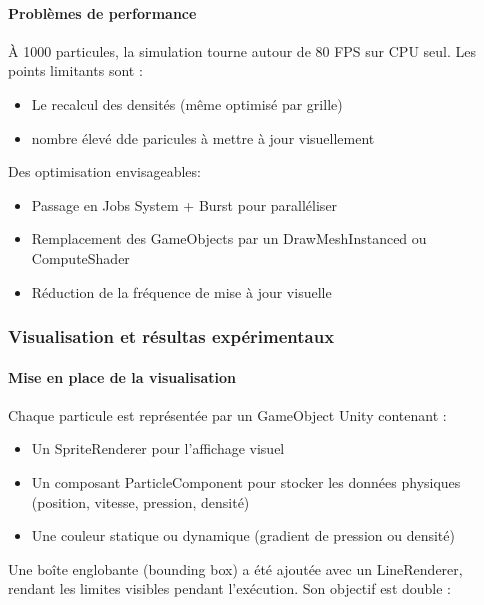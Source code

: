 \documentclass{article}
\begin{document}
\paragraph{Problèmes de performance}

À 1000 particules, la simulation tourne autour de 80 FPS sur CPU seul. Les points limitants sont :

\begin{itemize}
    \item Le recalcul des densités (même optimisé par grille)
    \item nombre élevé dde paricules à mettre à jour visuellement
\end{itemize}

Des optimisation envisageables:

\begin{itemize}
    \item Passage en Jobs System + Burst pour paralléliser
    \item Remplacement des GameObjects par un DrawMeshInstanced ou ComputeShader
    \item Réduction de la fréquence de mise à jour visuelle
\end{itemize}

\subsubsection{Visualisation et résultas expérimentaux}

\paragraph{Mise en place de la visualisation}

Chaque particule est représentée par un GameObject Unity contenant :

\begin{itemize}
    \item Un SpriteRenderer pour l'affichage visuel
    \item Un composant ParticleComponent pour stocker les données physiques (position, vitesse, pression, densité)
    \item Une couleur statique ou dynamique (gradient de pression ou densité)
\end{itemize}

Une boîte englobante (bounding box) a été ajoutée avec un LineRenderer, rendant les limites visibles pendant l'exécution. Son objectif est double :
\end{document}
